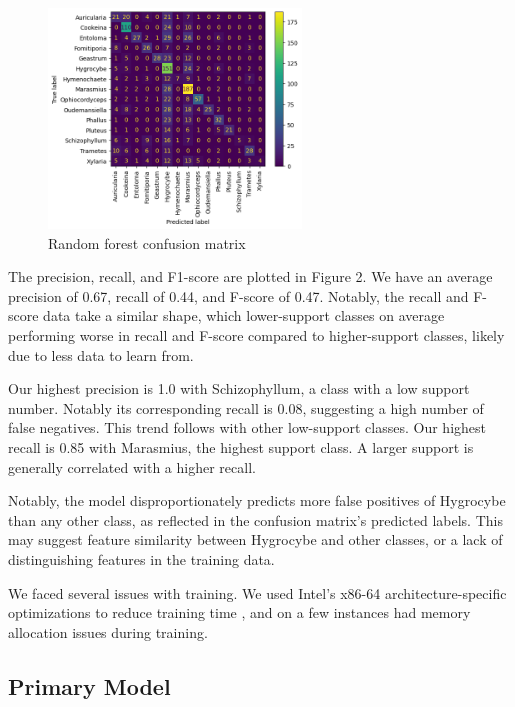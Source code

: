 \documentclass{article} %
\begin{document}
\begin{figure}[h]
    \begin{center}
    \includegraphics[width=0.6\textwidth]{figures/baseline_matrix.png}
    \end{center}
    \caption{Random forest confusion matrix}
\end{figure}

The precision, recall, and F1-score are plotted in Figure 2. We have an average precision of 0.67, recall of 0.44, and F-score of 0.47. Notably, the recall and F-score data take a similar shape, which lower-support classes on average performing worse in recall and F-score compared to higher-support classes, likely due to less data to learn from.

Our highest precision is 1.0 with Schizophyllum, a class with a low support number. Notably its corresponding recall is 0.08, suggesting a high number of false negatives. This trend follows with other low-support classes. Our highest recall is 0.85 with Marasmius, the highest support class. A larger support is generally correlated with a higher recall.

Notably, the model disproportionately predicts more false positives of Hygrocybe than any other class, as reflected in the confusion matrix's predicted labels. This may suggest feature similarity between Hygrocybe and other classes, or a lack of distinguishing features in the training data.

We faced several issues with training. We used Intel's x86-64 architecture-specific optimizations to reduce training time \citep{SchlimbachAndreevEtAl.IntelExtensionScikitlearn.2023}, and on a few instances had memory allocation issues during training.

\subsection{Primary Model}
\end{document}

